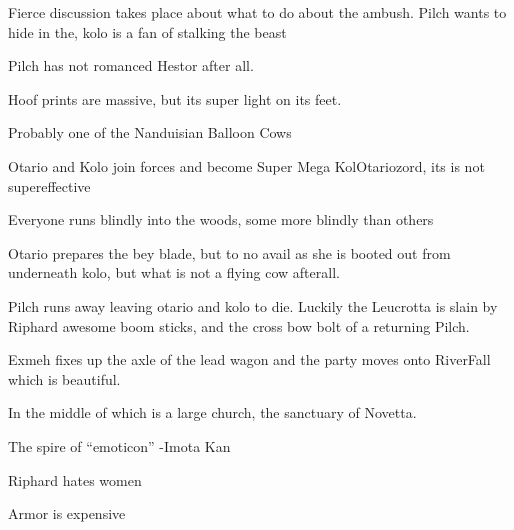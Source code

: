 Fierce discussion takes place about what to do about the ambush. Pilch wants to hide in the, kolo is a fan of stalking the beast    

Pilch has not romanced Hestor after all.    

Hoof prints are massive, but its super light on its feet.    

Probably one of the Nanduisian Balloon Cows    

Otario and Kolo join forces and become Super Mega KolOtariozord, its is not supereffective    

Everyone runs blindly into the woods, some more blindly than others    

Otario prepares the bey blade, but to no avail as she is booted out from underneath kolo, but what is not a flying cow afterall.    

Pilch runs away leaving otario and kolo to die. Luckily the Leucrotta is slain by Riphard awesome boom sticks, and the cross bow bolt of a returning Pilch.    

Exmeh fixes up the axle of the lead wagon and the party moves onto RiverFall which is beautiful.    

In the middle of which is  a large church, the sanctuary of Novetta.    

The spire of “emoticon” -Imota Kan    

Riphard hates women    

Armor is expensive
\clearpage